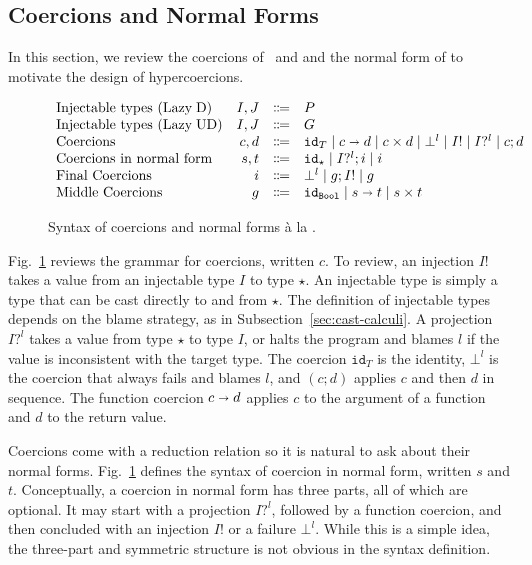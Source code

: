 \documentclass[runningheads]{llncs}
\newcommand{\stxrule}[3]{\text{#2} & #1 & \Coloneqq & #3\\}
\newcommand{\figref}[1]{Fig.~\ref{#1}}
\newcommand{\LUD}{\ensuremath{\text{Lazy\;UD}}}
\newcommand{\LD}{\ensuremath{\text{Lazy\;D}}}
\newcommand{\Tdyn}[0]{\ensuremath{\star}}
\newcommand{\Pbool}[0]{\ensuremath{\mathtt{Bool}}}
\newcommand{\Pfunc}[2]{\ensuremath{#1 \shortrightarrow #2}}
\newcommand{\Pprod}[2]{\ensuremath{#1 \times #2}}
\newcommand{\cnfproj}[2]{#1?^{#2}}
\newcommand{\cnfinj}[1]{#1!}
\newcommand{\cnfseq}[2]{#1;#2}
\newcommand{\cnffail}[1]{\bot^{#1}}
\newcommand{\cnffunc}[2]{\Pfunc{#1}{#2}}
\newcommand{\cnfprod}[2]{\Pprod{#1}{#2}}
\newcommand{\cnfid}[1]{\ensuremath{\mathtt{id}_{#1}}}
\begin{document}
\subsection{Coercions and Normal Forms} 
\label{sec:coercions}

In this section, we review the coercions
of~\citet{henglein1994dynamic} and \citet{herman2010space} and the
normal form of \citet{siek2012interpretations} to motivate the design
of hypercoercions.

\begin{figure}[tp]
	\[
	\begin{array}{lrcl}
	\stxrule{I,J}{Injectable types (\LD)}{P}
	\stxrule{I,J}{Injectable types (\LUD)}{G}
	\stxrule{c,d}{Coercions}{
		\cnfid{T}       \mid
		\cnffunc{c}{d}  \mid
		\cnfprod{c}{d}  \mid
		\cnffail{l}     \mid
		\cnfinj{I}      \mid
		\cnfproj{I}{l}  \mid
		\cnfseq{c}{d}
	}
	\stxrule{s,t}{Coercions in normal form}{
		\cnfid{\Tdyn}       \mid
		\cnfseq{\cnfproj{I}{l}}{i} \mid
		i
	}
	\stxrule{i}{Final Coercions}{
		\cnffail{l} \mid
		\cnfseq{g}{\cnfinj{I}} \mid
		g
	}
	\stxrule{g}{Middle Coercions}{
		\cnfid{\Pbool} \mid
		\cnffunc{s}{t} \mid
		\cnfprod{s}{t}
	}
	\end{array}
	\]
	\caption{Syntax of coercions and normal forms {\`a} la 
		\citet{siek2012interpretations}.}
	\label{fig:normal-coercion}
\end{figure}

\figref{fig:normal-coercion} reviews the grammar for coercions,
written $c$.
%
To review, an injection $\cnfinj{I}$ takes a value from an injectable type
$I$ to type $\Tdyn$. An injectable type is simply a type that can be
cast directly to and from $\Tdyn$. The
definition of injectable types depends on the blame strategy, as in 
Subsection~\ref{sec:cast-calculi}.
%
A projection $I?^l$ takes a value from type $\Tdyn$ to type $I$, or
halts the program and blames $l$ if the value is inconsistent with 
the target type.
The coercion \cnfid{T} is the identity, $\bot^{l}$ is the coercion that
always fails and blames $l$, and $(\cnfseq{c}{d})$ applies $c$ and
then $d$ in sequence. The function coercion $\cnffunc{c}{d}$
applies $c$ to the argument of a function and $d$ to the return
value.

Coercions come with a reduction relation so it is natural to ask about
their normal forms. \figref{fig:normal-coercion} defines the syntax of
coercion in normal form, written $s$ and $t$.
Conceptually, a coercion
in normal form has three parts, all of which are optional.  It may
start with a projection $I?^l$, followed by a function coercion, and
then concluded with an injection $I!$ or a failure $\bot^l$. While
this is a simple idea, 
the three-part and symmetric structure is not obvious in the syntax definition.
\end{document}
